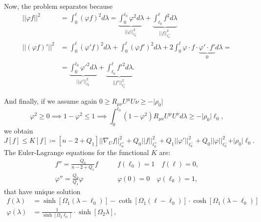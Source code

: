 Now, the problem separates because
\begin{align*}
    \vert\vert\varphi f\vert\vert^2 &= \int_0^{\ell} \left(\varphi f\right)^2 d\lambda = \underbrace{\int_0^{\ell_0}\varphi^2d\lambda}_{\vert\vert\varphi \vert\vert_{\ell_0^-}^2} + \underbrace{\int_{\ell_0}^{\ell}f^2d\lambda}_{\vert\vert f \vert\vert_{\ell_0^+}^2} \\
    \vert\vert\left(\varphi f\right)'\vert\vert^2 &= \int_0^{\ell} \left(\varphi' f\right)^2 d\lambda +\int_0^{\ell} \left(\varphi f'\right)^2 d\lambda + 2 \int_0^{\ell} \varphi\cdot f\cdot \underbrace{\varphi'\cdot f'}_{0}d\lambda = \\
    &= \underbrace{\int_0^{\ell_0}\varphi'^2d\lambda}_{\vert\vert\varphi '\vert\vert_{\ell_0^-}^2} + \underbrace{\int_{\ell_0}^{\ell}f'^2d\lambda}_{\vert\vert f' \vert\vert_{\ell_0^+}^2}.
\end{align*}

And finally, if we assume again \(0 \ge R_{\mu\nu}U^{\mu}U{\nu} \ge - \vert\rho_0\vert\) 
\[
\varphi^2 \ge 0 \implies 1 - \varphi^2 \le 1 \implies \int_0^{\ell_0} \left(1 - \varphi^2\right) R_{\mu\nu}U^{\mu}U^{\nu} d\lambda \ge -\vert\rho_0\vert \ell_0,    
\]
we obtain
\[
J[f] \le K[f] \coloneqq \left[n - 2 + Q_1\right] \vert\vert\nabla_U f \vert\vert_{\ell_0^+}^2 + Q_0\vert\vert f \vert\vert_{\ell_0^+}^2 + Q_1 \vert\vert\varphi '\vert\vert_{\ell_0^-}^2 + Q_0\vert\vert\varphi\vert\vert_{\ell_0^-}^2 + \vert\rho_0\vert \ell_0.
\]
The Euler-Lagrange equations for the functional \(K\) are:
\begin{align*}
    f '' = \frac{Q_0}{n -2 + Q_1}f \quad\quad &f(\ell_0) = 1 \quad f(\ell) = 0,\\
    \varphi'' = \frac{Q_0}{Q_1}\varphi \quad\quad &\varphi(0) = 0 \quad \varphi(\ell_0) = 1,
\end{align*}
that have unique solution
\begin{align*}
    f(\lambda) &= \sinh\left[\Omega_1(\lambda - \ell_0)\right]-\coth\left[\Omega_1(\ell - \ell_0)\right]\cdot\cosh\left[\Omega_1(\lambda - \ell_0)\right] \\
    \varphi(\lambda) &= \frac{1}{\sinh\left[\Omega_2\ell_0\right]} \cdot \sinh\left[\Omega_2\lambda\right],
\end{align*}

